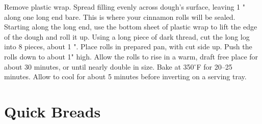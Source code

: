 \begin{minipage}{\linewidth}
{Remove plastic wrap. Spread filling evenly across dough's surface, leaving 1 " along one long end bare. This is where your cinnamon rolls will be sealed.
Starting along the long end, use the bottom sheet of plastic wrap to lift the edge of the dough and roll it up. Using a long piece of dark thread, cut the long log into 8 pieces, about 1 ". Place rolls in prepared pan, with cut side up. Push the rolls down to about 1" high.
Allow the rolls to rise in a warm, draft free place for about 30 minutes, or until nearly double in size. Bake at 350${}^\circ$F for 20--25 minutes. Allow to cool for about 5 minutes before inverting on a serving tray.}
\end{minipage}

\section{Quick Breads}
